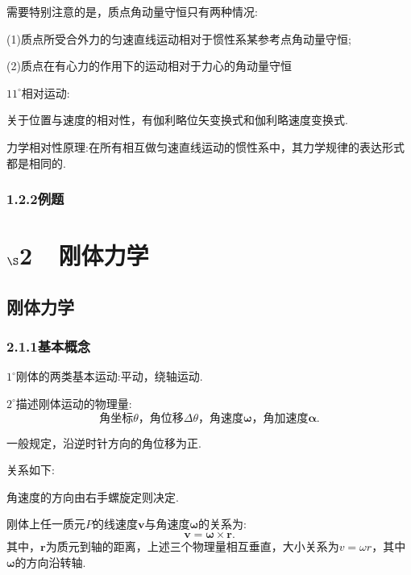 \documentclass[UTF8]{ctexart}
\begin{document}
	需要特别注意的是，质点角动量守恒只有两种情况:

	(1)质点所受合外力的匀速直线运动相对于惯性系某参考点角动量守恒;

	(2)质点在有心力的作用下的运动相对于力心的角动量守恒

	$11^{\circ}$相对运动:

	关于位置与速度的相对性，有伽利略位矢变换式和伽利略速度变换式.

	力学相对性原理:在所有相互做匀速直线运动的惯性系中，其力学规律的表达形式都是相同的.
	\subsubsection*{1.2.2例题}



\newpage
	\section*{$\S$2~~刚体力学}
	\subsection*{刚体力学}
	\subsubsection*{2.1.1基本概念}
	$1^{\circ}$刚体的两类基本运动:平动，绕轴运动.

	$2^{\circ}$描述刚体运动的物理量:
	\begin{equation*}
		\text{角坐标}\theta\text{，}\text{角位移} \Delta\theta\text{，}\text{角速度}{\boldsymbol \omega}\text{，}\text{角加速度} {\boldsymbol\alpha}.
	\end{equation*}

	一般规定，沿逆时针方向的角位移为正.

	关系如下:
	
	角速度的方向由右手螺旋定则决定.
	
	刚体上任一质元$P$的线速度${\boldsymbol v}$与角速度${\boldsymbol \omega}$的关系为:
	\begin{equation*}
		{\boldsymbol v}={\boldsymbol \omega}\times{\boldsymbol r}.
	\end{equation*}
	其中，${\boldsymbol r}$为质元到轴的距离，上述三个物理量相互垂直，大小关系为$v=\omega r$，其中${\boldsymbol \omega}$的方向沿转轴.
\end{document}
